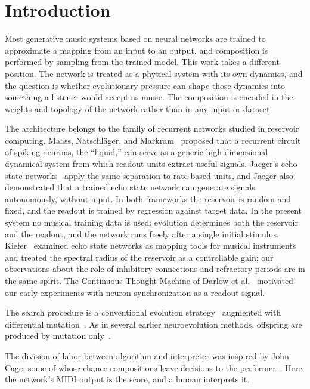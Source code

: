 \documentclass[conference]{IEEEtran}
\begin{document}
\section{Introduction}

Most generative music systems based on neural networks are trained to approximate a mapping from an input to an output, and composition is performed by sampling from the trained model. This work takes a different position. The network is treated as a physical system with its own dynamics, and the question is whether evolutionary pressure can shape those dynamics into something a listener would accept as music. The composition is encoded in the weights and topology of the network rather than in any input or dataset.

The architecture belongs to the family of recurrent networks studied in reservoir computing. Maass, Natschläger, and Markram~\cite{maass2002} proposed that a recurrent circuit of spiking neurons, the ``liquid,'' can serve as a generic high-dimensional dynamical system from which readout units extract useful signals. Jaeger's echo state networks~\cite{jaeger2001} apply the same separation to rate-based units, and Jaeger also demonstrated that a trained echo state network can generate signals autonomously, without input. In both frameworks the reservoir is random and fixed, and the readout is trained by regression against target data. In the present system no musical training data is used: evolution determines both the reservoir and the readout, and the network runs freely after a single initial stimulus. Kiefer~\cite{kiefer2014} examined echo state networks as mapping tools for musical instruments and treated the spectral radius of the reservoir as a controllable gain; our observations about the role of inhibitory connections and refractory periods are in the same spirit. The Continuous Thought Machine of Darlow et al.~\cite{darlow2025} motivated our early experiments with neuron synchronization as a readout signal.

The search procedure is a conventional evolution strategy~\cite{beyer2002} augmented with differential mutation~\cite{storn1997}. As in several earlier neuroevolution methods, offspring are produced by mutation only~\cite[\S2.1.3]{stanley2002}.

The division of labor between algorithm and interpreter was inspired by John Cage, some of whose chance compositions leave decisions to the performer~\cite{pritchett1993}. Here the network's MIDI output is the score, and a human interprets it.
\end{document}
